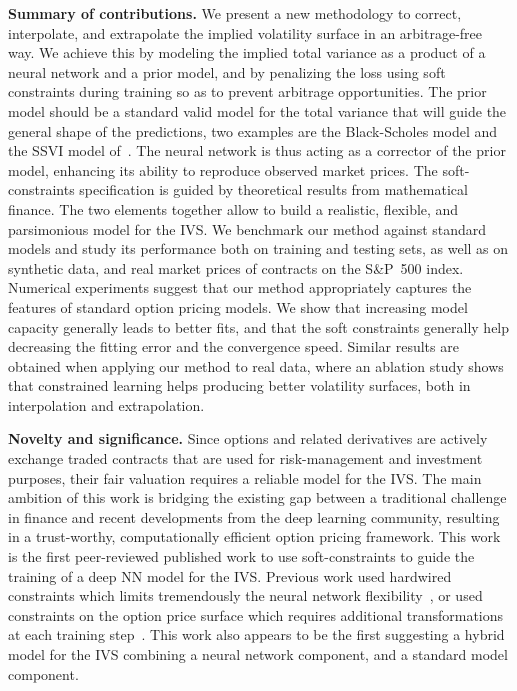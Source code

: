 \textbf{Summary of contributions.}
We present a new methodology to correct, interpolate, and extrapolate the implied volatility surface in an arbitrage-free way.
We achieve this by modeling the implied total variance as a product of a neural network and a prior model, and by penalizing the loss using soft constraints during training so as to prevent arbitrage opportunities.
The prior model should be a standard valid model for the total variance that will guide the general shape of the predictions, two examples are the Black-Scholes model and the SSVI model of~\cite{gatheral2014arbitrage}.
The neural network is thus acting as a corrector of the prior model, enhancing its ability to reproduce observed market prices.
The soft-constraints specification is guided by theoretical results from mathematical finance.
The two elements together allow to build a realistic, flexible, and parsimonious model for the IVS.
We benchmark our method against standard models and study its performance both on training and testing sets, as well as on synthetic data, and real market prices of contracts on the S\&P~500 index.
Numerical experiments suggest that our method appropriately captures the features of standard option pricing models.
We show that increasing model capacity generally leads to better fits, and that the soft constraints generally help decreasing the fitting error and the convergence speed.
Similar results are obtained when applying our method to real data, where an ablation study shows that constrained learning helps producing better volatility surfaces, both in interpolation and extrapolation.

\textbf{Novelty and significance.}
Since options and related derivatives are actively exchange traded contracts that are used for risk-management and investment purposes, their fair valuation requires a reliable model for the IVS.
The main ambition of this work is bridging the existing gap between a traditional challenge in finance and recent developments from the deep learning community, resulting in a trust-worthy, computationally efficient option pricing framework.
This work is the first peer-reviewed published work to use soft-constraints to guide the training of a deep NN model for the IVS.
Previous work used hardwired constraints which limits tremendously the neural network flexibility~\cite{dugas2001incorporating}, or used constraints on the option price surface which requires additional transformations at each training step~\cite{ludwig2015robust}.
This work also appears to be the first suggesting a hybrid model for the IVS combining a neural network component, and a standard model component.

